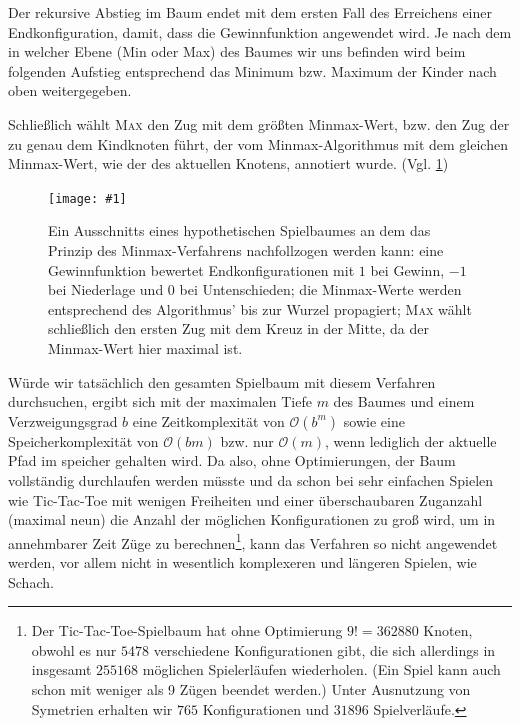 \documentclass[a4paper,twoside]{scrartcl}
\newcommand\q[1]{\glqq #1\grqq}
\newcommand\g[4]{%
  \begin{figure}[!ht]
  \label{fig:#2}
  \centering
  \texttt{[image: \#1]}
  \caption{#3}
  \end{figure}}
\begin{document}
Der rekursive Abstieg im Baum endet mit dem ersten Fall des Erreichens einer Endkonfiguration, damit, dass die Gewinnfunktion angewendet wird. Je nach dem in welcher Ebene (Min oder Max) des Baumes wir uns befinden wird beim folgenden Aufstieg entsprechend das Minimum bzw. Maximum der Kinder nach oben weitergegeben.

Schließlich wählt \textsc{Max} den Zug mit dem größten Minmax-Wert, bzw. den Zug der zu genau dem Kindknoten führt, der vom Minmax-Algorithmus mit dem gleichen Minmax-Wert, wie der des aktuellen Knotens, annotiert wurde. (Vgl. \ref{fig:minmax})

\g{img/tic_minmax_2.pdf}{minmax}{Ein Ausschnitts eines hypothetischen Spielbaumes an dem das Prinzip des Minmax-Verfahrens nachfollzogen werden kann: eine Gewinnfunktion bewertet Endkonfigurationen mit $1$ bei Gewinn, $-1$ bei Niederlage und $0$ bei Untenschieden; die Minmax-Werte werden entsprechend des Algorithmus' bis zur Wurzel propagiert; \textsc{Max} wählt schließlich den ersten Zug mit dem Kreuz in der Mitte, da der Minmax-Wert hier maximal ist.}{.4}

Würde wir tatsächlich den gesamten Spielbaum mit diesem Verfahren durchsuchen, ergibt sich mit der maximalen Tiefe $m$ des Baumes und einem Verzweigungsgrad $b$ eine Zeitkomplexität von $\mathcal{O}(b^m)$ sowie eine Speicherkomplexität von $\mathcal{O}(bm)$ bzw. nur $\mathcal{O}(m)$, wenn lediglich der aktuelle Pfad im speicher gehalten wird. Da also, ohne Optimierungen, der Baum vollständig durchlaufen werden müsste und da schon bei sehr einfachen Spielen wie Tic-Tac-Toe mit wenigen Freiheiten und einer überschaubaren Zuganzahl (maximal neun) die Anzahl der möglichen Konfigurationen zu groß wird, um in annehmbarer Zeit Züge zu berechnen\footnote{Der Tic-Tac-Toe-Spielbaum hat ohne Optimierung $9! = 362880$ Knoten, obwohl es \q{nur} $5478$ verschiedene Konfigurationen gibt, die sich allerdings in insgesamt $255168$ möglichen Spielerläufen wiederholen. (Ein Spiel kann auch schon mit weniger als 9 Zügen beendet werden.) Unter Ausnutzung von Symetrien erhalten wir $765$ Konfigurationen und $31896$ Spielverläufe.}, kann das Verfahren so nicht angewendet werden, vor allem nicht in wesentlich komplexeren und längeren Spielen, wie Schach.
\end{document}
